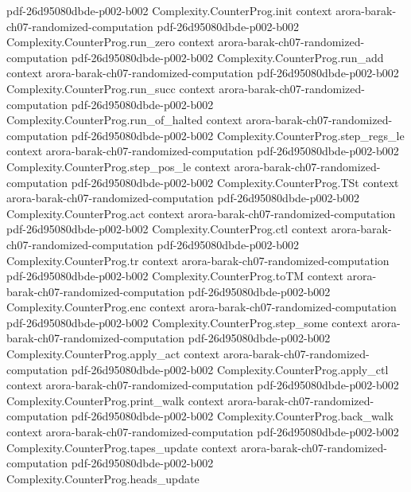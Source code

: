 \begin{theorem}
  {pdf-26d95080dbde-p002-b002}
\proofstep
  {Complexity.CounterProg.init}
  {context}
  {arora-barak-ch07-randomized-computation}
  {pdf-26d95080dbde-p002-b002}
\proofstep
  {Complexity.CounterProg.run_zero}
  {context}
  {arora-barak-ch07-randomized-computation}
  {pdf-26d95080dbde-p002-b002}
\proofstep
  {Complexity.CounterProg.run_add}
  {context}
  {arora-barak-ch07-randomized-computation}
  {pdf-26d95080dbde-p002-b002}
\proofstep
  {Complexity.CounterProg.run_succ}
  {context}
  {arora-barak-ch07-randomized-computation}
  {pdf-26d95080dbde-p002-b002}
\proofstep
  {Complexity.CounterProg.run_of_halted}
  {context}
  {arora-barak-ch07-randomized-computation}
  {pdf-26d95080dbde-p002-b002}
\proofstep
  {Complexity.CounterProg.step_regs_le}
  {context}
  {arora-barak-ch07-randomized-computation}
  {pdf-26d95080dbde-p002-b002}
\proofstep
  {Complexity.CounterProg.step_pos_le}
  {context}
  {arora-barak-ch07-randomized-computation}
  {pdf-26d95080dbde-p002-b002}
\proofstep
  {Complexity.CounterProg.TSt}
  {context}
  {arora-barak-ch07-randomized-computation}
  {pdf-26d95080dbde-p002-b002}
\proofstep
  {Complexity.CounterProg.act}
  {context}
  {arora-barak-ch07-randomized-computation}
  {pdf-26d95080dbde-p002-b002}
\proofstep
  {Complexity.CounterProg.ctl}
  {context}
  {arora-barak-ch07-randomized-computation}
  {pdf-26d95080dbde-p002-b002}
\proofstep
  {Complexity.CounterProg.tr}
  {context}
  {arora-barak-ch07-randomized-computation}
  {pdf-26d95080dbde-p002-b002}
\proofstep
  {Complexity.CounterProg.toTM}
  {context}
  {arora-barak-ch07-randomized-computation}
  {pdf-26d95080dbde-p002-b002}
\proofstep
  {Complexity.CounterProg.enc}
  {context}
  {arora-barak-ch07-randomized-computation}
  {pdf-26d95080dbde-p002-b002}
\proofstep
  {Complexity.CounterProg.step_some}
  {context}
  {arora-barak-ch07-randomized-computation}
  {pdf-26d95080dbde-p002-b002}
\proofstep
  {Complexity.CounterProg.apply_act}
  {context}
  {arora-barak-ch07-randomized-computation}
  {pdf-26d95080dbde-p002-b002}
\proofstep
  {Complexity.CounterProg.apply_ctl}
  {context}
  {arora-barak-ch07-randomized-computation}
  {pdf-26d95080dbde-p002-b002}
\proofstep
  {Complexity.CounterProg.print_walk}
  {context}
  {arora-barak-ch07-randomized-computation}
  {pdf-26d95080dbde-p002-b002}
\proofstep
  {Complexity.CounterProg.back_walk}
  {context}
  {arora-barak-ch07-randomized-computation}
  {pdf-26d95080dbde-p002-b002}
\proofstep
  {Complexity.CounterProg.tapes_update}
  {context}
  {arora-barak-ch07-randomized-computation}
  {pdf-26d95080dbde-p002-b002}
\proofstep
  {Complexity.CounterProg.heads_update}

\end{theorem}
